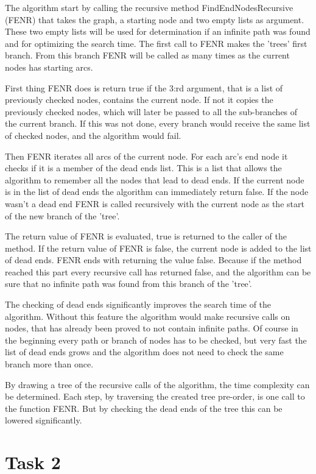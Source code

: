 \documentclass[]{article}
\begin{document}
The algorithm start by calling the recursive method FindEndNodesRecursive (FENR) that takes the graph, a starting node and two empty lists as argument. These two empty lists will be used for determination if an infinite path was found and for optimizing the search time. The first call to FENR makes the 'trees' first branch. From this branch FENR will be called as many times as the current nodes has starting arcs. 

First thing FENR does is return true if the 3:rd argument, that is a list of previously checked nodes, contains the current node. If not it copies the previously checked nodes, which will later be passed to all the sub-branches of the current branch. If this was not done, every branch would receive the same list of checked nodes, and the algorithm would fail. 

Then FENR iterates all arcs of the current node. For each arc's end node it checks if it is a member of the dead ends list. This is a list that allows the algorithm to remember all the nodes that lead to dead ends. If the current node is in the list of dead ends the algorithm can immediately return false. If the node wasn't a dead end FENR is called recursively with the current node as the start of the new branch of the 'tree'.

The return value of FENR is evaluated, true is returned to the caller of the method. If the return value of FENR is false, the current node is added to the list of dead ends. FENR ends with returning the value false. Because if the method reached this part every recursive call has returned false, and the algorithm can be sure that no infinite path was found from this branch of the 'tree'.

The checking of dead ends significantly improves the search time of the algorithm. Without this feature the algorithm would make recursive calls on nodes, that has already been proved to not contain infinite paths. Of course in the beginning every path or branch of nodes has to be checked, but very fast the list of dead ends grows and the algorithm does not need to check the same branch more than once.

By drawing a tree of the recursive calls of the algorithm, the time complexity can be determined. Each step, by traversing the created tree pre-order, is one call to the function FENR. But by checking the dead ends of the tree this can be lowered significantly.

\newpage
\section*{Task 2}
\end{document}
